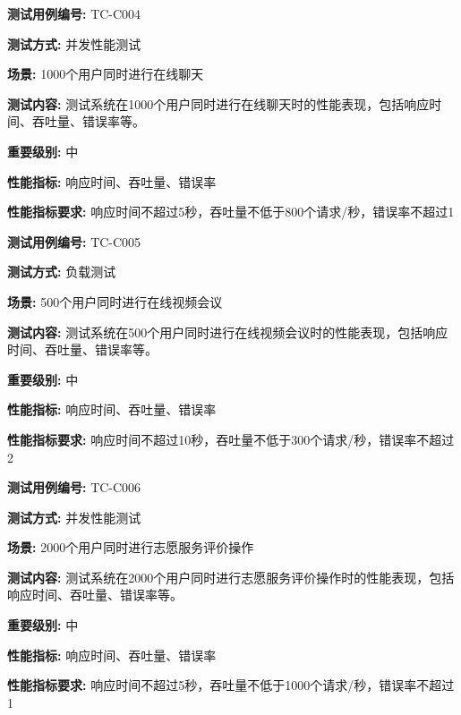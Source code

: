 \begin{framed} \textbf{测试用例编号:} TC-C004

\textbf{测试方式:} 并发性能测试

\textbf{场景:} 1000个用户同时进行在线聊天

\textbf{测试内容:} 测试系统在1000个用户同时进行在线聊天时的性能表现，包括响应时间、吞吐量、错误率等。

\textbf{重要级别:} 中

\textbf{性能指标:} 响应时间、吞吐量、错误率

\textbf{性能指标要求:} 响应时间不超过5秒，吞吐量不低于800个请求/秒，错误率不超过1%

\begin{center}
\end{center}
\end{framed}

\begin{framed} \textbf{测试用例编号:} TC-C005

\textbf{测试方式:} 负载测试

\textbf{场景:} 500个用户同时进行在线视频会议

\textbf{测试内容:} 测试系统在500个用户同时进行在线视频会议时的性能表现，包括响应时间、吞吐量、错误率等。

\textbf{重要级别:} 中

\textbf{性能指标:} 响应时间、吞吐量、错误率

\textbf{性能指标要求:} 响应时间不超过10秒，吞吐量不低于300个请求/秒，错误率不超过2%

\begin{center}
\end{center}
\end{framed}

\begin{framed} \textbf{测试用例编号:} TC-C006

\textbf{测试方式:} 并发性能测试

 \textbf{场景:} 2000个用户同时进行志愿服务评价操作

\textbf{测试内容:} 测试系统在2000个用户同时进行志愿服务评价操作时的性能表现，包括响应时间、吞吐量、错误率等。

\textbf{重要级别:} 中

\textbf{性能指标:} 响应时间、吞吐量、错误率

\textbf{性能指标要求:} 响应时间不超过5秒，吞吐量不低于1000个请求/秒，错误率不超过1%

\begin{center}  \end{center} \end{framed}

